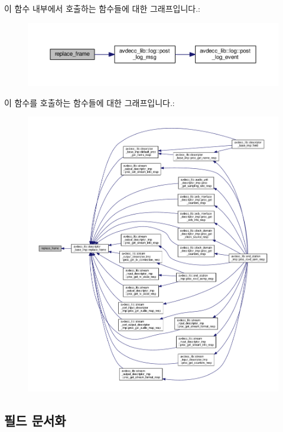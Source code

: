 이 함수 내부에서 호출하는 함수들에 대한 그래프입니다.\+:
\nopagebreak
\begin{figure}[H]
\begin{center}
\leavevmode
\includegraphics[width=350pt]{classavdecc__lib_1_1response__frame_adaac07821dba7c4ae2c35642d67a9a37_cgraph}
\end{center}
\end{figure}




이 함수를 호출하는 함수들에 대한 그래프입니다.\+:
\nopagebreak
\begin{figure}[H]
\begin{center}
\leavevmode
\includegraphics[width=350pt]{classavdecc__lib_1_1response__frame_adaac07821dba7c4ae2c35642d67a9a37_icgraph}
\end{center}
\end{figure}




\subsection{필드 문서화}
